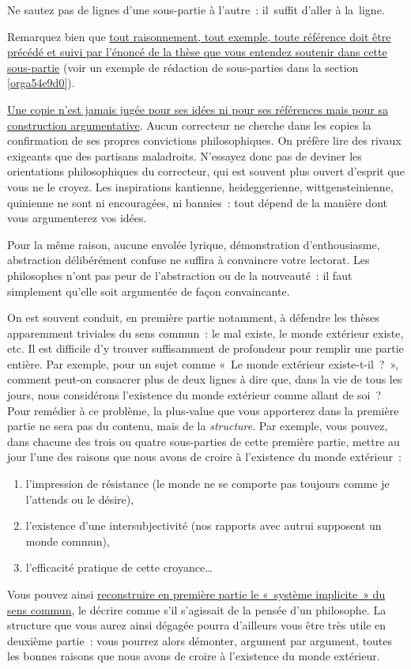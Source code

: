 \documentclass[a4paper,12pt]{report}
\begin{document}
Ne sautez pas de lignes d'une sous-partie à l'autre : il suffit d'aller
à la ligne.

Remarquez bien que \uline{tout raisonnement, tout exemple, toute référence
doit être précédé et suivi par l'énoncé de la thèse que vous entendez
soutenir dans cette sous-partie} (voir un exemple de rédaction de
sous-parties dans la section \ref{orga54e9d0}).

\uline{Une copie n'est jamais jugée pour ses idées ni pour ses références mais
pour sa construction argumentative}. Aucun correcteur ne cherche dans
les copies la confirmation de ses propres convictions philosophiques. On
préfère lire des rivaux exigeants que des partisans maladroits.
N'essayez donc pas de deviner les orientations philosophiques du
correcteur, qui est souvent plus ouvert d'esprit que vous ne le croyez.
Les inspirations kantienne, heideggerienne, wittgensteinienne, quinienne
ne sont ni encouragées, ni bannies : tout dépend de la manière dont vous
argumenterez vos idées.

Pour la même raison, aucune envolée lyrique, démonstration
d'enthousiasme, abstraction délibérément confuse ne suffira à convaincre
votre lectorat. Les philosophes n'ont pas peur de l'abstraction ou de la
nouveauté : il faut simplement qu'elle soit argumentée de façon
convaincante.

On est souvent conduit, en première partie notamment, à défendre les
thèses apparemment triviales du sens commun : le mal existe, le monde
extérieur existe, etc. Il est difficile d'y trouver suffisamment de
profondeur pour remplir une partie entière. Par exemple, pour un sujet
comme « Le monde extérieur existe-t-il ? », comment peut-on consacrer
plus de deux lignes à dire que, dans la vie de tous les jours, nous
considérons l'existence du monde extérieur comme allant de soi ?
Pour remédier à ce problème, la plus-value que vous apporterez dans la
première partie ne sera pas du contenu, mais de la \emph{structure}. Par
exemple, vous pouvez, dans chacune des trois ou quatre sous-parties de
cette première partie, mettre au jour l'une des raisons que nous avons
de croire à l'existence du monde extérieur :
\begin{enumerate}
\item l'impression de résistance (le monde ne se comporte pas toujours
comme je l'attends ou le désire),
\item l'existence d'une intersubjectivité (nos rapports avec autrui
supposent un monde commun),
\item l'efficacité pratique de cette croyance\ldots{}
\end{enumerate}
Vous pouvez ainsi \uline{reconstruire en première partie le « système
implicite » du sens commun}, le décrire comme s'il s'agissait de la
pensée d'un philosophe. La structure que vous aurez ainsi dégagée pourra
d'ailleurs vous être très utile en deuxième partie : vous pourrez alors
démonter, argument par argument, toutes les bonnes raisons que nous
avons de croire à l'existence du monde extérieur.
\end{document}
